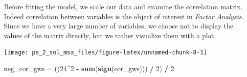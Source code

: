\documentclass[
]{article}
\newenvironment{Shaded}{\begin{snugshade}}{\end{snugshade}}
\newcommand{\AttributeTok}[1]{\textcolor[rgb]{0.13,0.29,0.53}{#1}}
\newcommand{\DecValTok}[1]{\textcolor[rgb]{0.00,0.00,0.81}{#1}}
\newcommand{\FloatTok}[1]{\textcolor[rgb]{0.00,0.00,0.81}{#1}}
\newcommand{\FunctionTok}[1]{\textcolor[rgb]{0.13,0.29,0.53}{\textbf{#1}}}
\newcommand{\NormalTok}[1]{#1}
\newcommand{\OtherTok}[1]{\textcolor[rgb]{0.56,0.35,0.01}{#1}}
\newcommand{\SpecialCharTok}[1]{\textcolor[rgb]{0.81,0.36,0.00}{\textbf{#1}}}
\newcommand{\StringTok}[1]{\textcolor[rgb]{0.31,0.60,0.02}{#1}}
\theoremstyle{plain}
\begin{document}
Before fitting the model, we scale our data and examine the correlation
matrix. Indeed correlation between variables is the object of interest
in \textit{Factor Analysis}. Since we have a very large number of
variables, we choose not to display the values of the matrix directly,
but we rather visualize them with a plot.

\smallskip

\begin{Shaded}
\end{Shaded}

\begin{center}\texttt{[image: ps\_2\_sol\_msa\_files/figure-latex/unnamed-chunk-8-1]} \end{center}

\begin{Shaded}
\begin{Highlighting}[]
\NormalTok{neg\_cor\_gws }\OtherTok{=}\NormalTok{ ((}\DecValTok{24}\SpecialCharTok{\^{}}\DecValTok{2} \SpecialCharTok{{-}} \FunctionTok{sum}\NormalTok{(}\FunctionTok{sign}\NormalTok{(cor\_gws))) }\SpecialCharTok{/} \DecValTok{2}\NormalTok{) }\SpecialCharTok{/} \DecValTok{2}
\end{Highlighting}
\end{Shaded}
\end{document}
